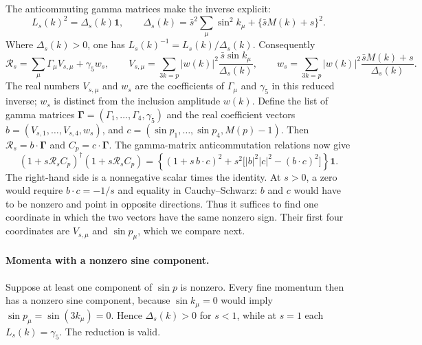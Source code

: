 \documentclass[11pt,a4paper]{article}
\theoremstyle{remark}
\newcommand{\Id}{\mathbf 1}
\begin{document}
The anticommuting gamma matrices make the inverse explicit:
\begin{equation}
 L_s(k)^2=\Delta_s(k)\Id,\qquad
 \Delta_s(k)=\bar s^2\sum_\mu\sin^2 k_\mu+
                  \{\bar s M(k)+s\}^2 .
\end{equation}
Where $\Delta_s(k)>0$, one has
$L_s(k)^{-1}=L_s(k)/\Delta_s(k)$. Consequently
\begin{equation}
 \mathcal R_s=\sum_\mu\Gamma_\mu V_{s,\mu}+\gamma_5 w_s,\qquad
 V_{s,\mu}=\sum_{3k=p}|w(k)|^2
                  \frac{\bar s\sin k_\mu}{\Delta_s(k)},
 \qquad
 w_s=\sum_{3k=p}|w(k)|^2
                  \frac{\bar s M(k)+s}{\Delta_s(k)} .
\end{equation}
The real numbers $V_{s,\mu}$ and $w_s$ are the coefficients of
$\Gamma_\mu$ and $\gamma_5$ in this reduced inverse; $w_s$
is distinct from the inclusion amplitude $w(k)$. Define the list of
gamma matrices
$\boldsymbol\Gamma=(\Gamma_1,\allowbreak\ldots,\allowbreak\Gamma_4,\allowbreak\gamma_5)$
and the real coefficient vectors
$b=(V_{s,1},\allowbreak\ldots,\allowbreak V_{s,4},\allowbreak w_s)$, and
$c=(\sin p_1,\allowbreak\ldots,\allowbreak\sin p_4,\allowbreak M(p)-1)$. Then
$\mathcal R_s=b\cdot\boldsymbol\Gamma$ and
$C_p=c\cdot\boldsymbol\Gamma$. The gamma-matrix anticommutation relations now give
\begin{equation}
 (1+s\mathcal R_sC_p)^{\dagger}(1+s\mathcal R_sC_p)
 =\left\{(1+s\,b\cdot c)^2+
       s^2\bigl[|b|^2|c|^2-(b\cdot c)^2\bigr]\right\}\Id .
\end{equation}
The right-hand side is a nonnegative scalar times the identity.
At $s>0$, a zero would require
$b\cdot c=-1/s$ and equality in Cauchy--Schwarz: $b$ and $c$
would have to be nonzero and point in opposite directions. Thus it suffices to find one coordinate in which the two vectors have
the same nonzero sign. Their first four coordinates are
$V_{s,\mu}$ and $\sin p_\mu$, which we compare next.

\paragraph{Momenta with a nonzero sine component.}
Suppose at least one component of $\sin p$ is nonzero. Every fine
momentum then has a nonzero sine component, because
$\sin k_\mu=0$ would imply $\sin p_\mu=\sin(3k_\mu)=0$.
Hence $\Delta_s(k)>0$ for $s<1$, while at $s=1$ each
$L_s(k)=\gamma_5$. The reduction is valid.
\end{document}
